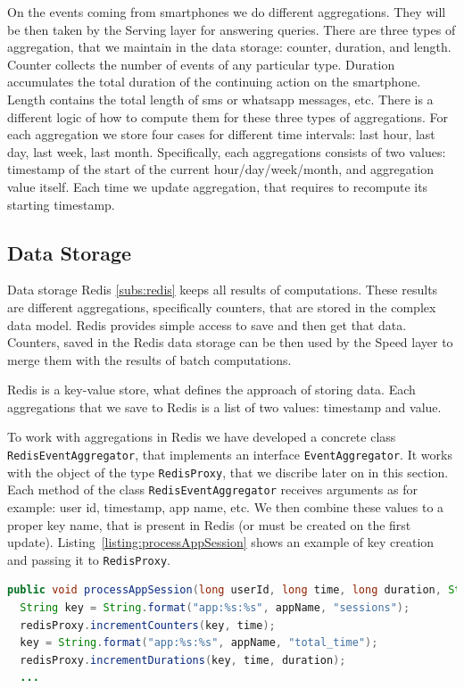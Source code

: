 On the events coming from smartphones we do different aggregations.
They will be then taken by the Serving layer for answering queries.
There are three types of aggregation, that we maintain in the data storage: counter, duration, and length.
Counter collects the number of events of any particular type.
Duration accumulates the total duration of the continuing action on the smartphone.
Length contains the total length of sms or whatsapp messages, etc.
There is a different logic of how to compute them for these three types of aggregations. 
For each aggregation we store four cases for different time intervals: last hour, last day, last week, last month.
Specifically, each aggregations consists of two values: timestamp of the start of the current hour/day/week/month, and aggregation value itself.
Each time we update aggregation, that requires to recompute its starting timestamp.

\subsection{Data Storage}

Data storage Redis \ref{subs:redis} keeps all results of computations.
These results are different aggregations, specifically counters, that are stored in the complex data model.
Redis provides simple access to save and then get that data.
Counters, saved in the Redis data storage can be then used by the Speed layer to merge them with the results of batch computations.

Redis is a key-value store, what defines the approach of storing data.
Each aggregations that we save to Redis is a list of two values: timestamp and value.

To work with aggregations in Redis we have developed a concrete class \lstinline{RedisEventAggregator}, that implements an interface \lstinline{EventAggregator}.
It works with the object of the type \lstinline{RedisProxy}, that we discribe later on in this section.
Each method of the class \lstinline{RedisEventAggregator} receives arguments as for example: user id, timestamp, app name, etc.
We then combine these values to a proper key name, that is present in Redis (or must be created on the first update).
Listing~\ref{listing:processAppSession} shows an example of key creation and passing it to \lstinline{RedisProxy}.

\begin{lstlisting}[float=h, caption=Example of key creation for aggregation update., label=listing:processAppSession, language=Java]
public void processAppSession(long userId, long time, long duration, String appName) {
  String key = String.format("app:%s:%s", appName, "sessions");
  redisProxy.incrementCounters(key, time);
  key = String.format("app:%s:%s", appName, "total_time");
  redisProxy.incrementDurations(key, time, duration);
  ...
\end{lstlisting}

